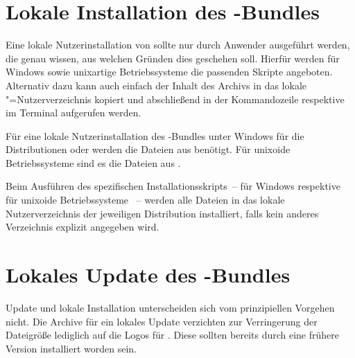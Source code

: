 \section{Lokale Installation des \TUDScript-Bundles}
%
%
%
Eine lokale Nutzerinstallation von \TUDScript sollte nur durch Anwender 
ausgeführt werden, die genau wissen, aus welchen Gründen dies geschehen soll.
Hierfür werden für Windows sowie unixartige Betriebssysteme die passenden 
Skripte angeboten. Alternativ dazu kann auch einfach der Inhalt des Archivs
%
{}
in das lokale "=Nutzerverzeichnis kopiert und abschließend in der 
Kommandozeile respektive im Terminal  aufgerufen werden. 

Für eine lokale Nutzerinstallation des \TUDScript-Bundles unter Windows für die 
Distributionen  oder 
 werden die Dateien aus
%
{}
benötigt. Für unixoide Betriebssysteme sind es die Dateien aus 
%
{}.

Beim Ausführen des spezifischen Installationsskripts~-- für Windows 
 respektive für unixoide Betriebssysteme
~-- werden alle Dateien in das lokale 
Nutzerverzeichnis der jeweiligen Distribution installiert, falls kein anderes 
Verzeichnis explizit angegeben wird. 



\section{Lokales Update des \TUDScript-Bundles}
%
%
%
Update und lokale Installation unterscheiden sich vom prinzipiellen Vorgehen 
nicht. Die Archive für ein lokales Update verzichten zur Verringerung der 
Dateigröße lediglich auf die Logos für \TUDScript. Diese sollten  bereits durch 
eine frühere Version installiert worden sein.

